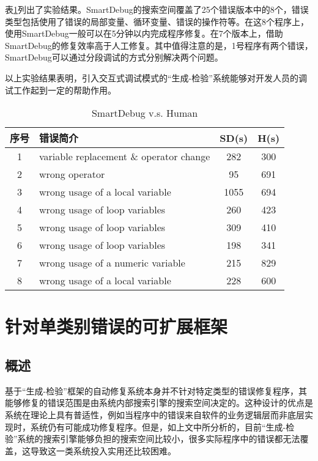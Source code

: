 表\ref{tab:sd-vs-human}列出了实验结果。SmartDebug的搜索空间覆盖了25个错误版本中的8个，错误类型包括使用了错误的局部变量、循环变量、错误的操作符等。在这8个程序上，使用SmartDebug一般可以在5分钟以内完成程序修复。在7个版本上，借助SmartDebug的修复效率高于人工修复。其中值得注意的是，1号程序有两个错误，SmartDebug可以通过分段调试的方式分别解决两个问题。

以上实验结果表明，引入交互式调试模式的“生成-检验”系统能够对开发人员的调试工作起到一定的帮助作用。

\begin{table}[!t]
	\centering
	\caption{SmartDebug v.s. Human}
	\label{tab:sd-vs-human}
	\begin{tabular}{|c|l|c|c|} \hline
		序号& 错误简介 									& SD(s) & H(s)	\\	\hline
		1  & variable replacement \& operator change				& 282	& 300	\\	\hline
		2  & wrong operator									& 95	& 691	\\	\hline
		3  & wrong usage of a local variable				& 1055	& 694	\\  \hline
		4  & wrong usage of loop variables					& 260	& 423	\\	\hline
		5  & wrong usage of loop variables					& 309	& 410	\\	\hline
		6  & wrong usage of loop variables					& 198	& 341 	\\	\hline
		7 & wrong usage of a numeric variable				& 215	& 829	\\	\hline
		8 & wrong usage of a local variable				& 228	& 600	\\	\hline
		
	\end{tabular}
\end{table}

\section{针对单类别错误的可扩展框架}%

\subsection{概述}%

基于“生成-检验”框架的自动修复系统本身并不针对特定类型的错误修复程序，其能够修复的错误范围是由系统内部搜索引擎的搜索空间决定的。这种设计的优点是系统在理论上具有普适性，例如当程序中的错误来自软件的业务逻辑层而非底层实现时，系统仍有可能成功修复程序。但是，如上文中所分析的，目前“生成-检验”系统的搜索引擎能够负担的搜索空间比较小，很多实际程序中的错误都无法覆盖，这导致这一类系统投入实用还比较困难。

